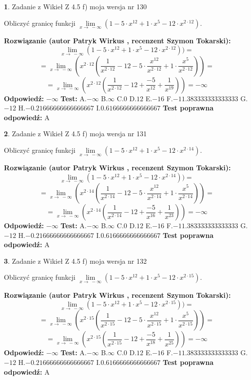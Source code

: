 \documentclass[12pt, a4paper]{article}
\theoremstyle{definition} %
\newtheorem{zad}{}
\newcommand{\zadStart}[1]{\begin{zad}#1\newline}
\newcommand{\zadStop}{\end{zad}}
\newcommand{\rozwStart}[2]{\noindent \textbf{Rozwiązanie (autor #1 , recenzent #2): }\newline}
\newcommand{\rozwStop}{\newline}
\newcommand{\odpStart}{\noindent \textbf{Odpowiedź:}\newline}
\newcommand{\odpStop}{\newline}
\newcommand{\testStart}{\noindent \textbf{Test:}\newline}
\newcommand{\testStop}{\newline}
\newcommand{\kluczStart}{\noindent \textbf{Test poprawna odpowiedź:}\newline}
\newcommand{\kluczStop}{\newline}
\begin{document}
\zadStart{Zadanie z Wikieł Z 4.5 f) moja wersja nr 130}


Obliczyć granicę funkcji  $\lim\limits_{x\to\ -\infty}(1 - 5 \cdot x^{12}+1 \cdot x^{5}- 12 \cdot x^{2\cdot12})$.
\zadStop
\rozwStart{Patryk Wirkus}{Szymon Tokarski}
$$\lim\limits_{x\to\ -\infty}(1 - 5 \cdot x^{12}+1 \cdot x^{5}- 12 \cdot x^{2\cdot12}))=$$
$$=\lim\limits_{x\to\ -\infty}(x^{2\cdot12}(\frac{1}{x^{2\cdot12}}-12 -5 \cdot \frac{x^{12}}{x^{2\cdot12}}+1 \cdot \frac{x^{5}}{x^{2\cdot12}}))=$$
$$=\lim\limits_{x\to\ -\infty}(x^{2\cdot12}(\frac{1}{x^{2\cdot12}}-12 + \frac{-5}{x^{12}}+ \frac{1}{x^{19}}))=-\infty$$
\rozwStop
\odpStart
$-\infty$
\odpStop
\testStart
A.$-\infty$ B.$\infty$ C.$0$ D.$12$ E.$-16$
F.$-11.383333333333333$ G.$-12$
H.$-0.21666666666666667$
I.$0.6166666666666667$
\testStop
\kluczStart
A
\kluczStop



\zadStart{Zadanie z Wikieł Z 4.5 f) moja wersja nr 131}


Obliczyć granicę funkcji  $\lim\limits_{x\to\ -\infty}(1 - 5 \cdot x^{12}+1 \cdot x^{5}- 12 \cdot x^{2\cdot14})$.
\zadStop
\rozwStart{Patryk Wirkus}{Szymon Tokarski}
$$\lim\limits_{x\to\ -\infty}(1 - 5 \cdot x^{12}+1 \cdot x^{5}- 12 \cdot x^{2\cdot14}))=$$
$$=\lim\limits_{x\to\ -\infty}(x^{2\cdot14}(\frac{1}{x^{2\cdot14}}-12 -5 \cdot \frac{x^{12}}{x^{2\cdot14}}+1 \cdot \frac{x^{5}}{x^{2\cdot14}}))=$$
$$=\lim\limits_{x\to\ -\infty}(x^{2\cdot14}(\frac{1}{x^{2\cdot14}}-12 + \frac{-5}{x^{16}}+ \frac{1}{x^{23}}))=-\infty$$
\rozwStop
\odpStart
$-\infty$
\odpStop
\testStart
A.$-\infty$ B.$\infty$ C.$0$ D.$12$ E.$-16$
F.$-11.383333333333333$ G.$-12$
H.$-0.21666666666666667$
I.$0.6166666666666667$
\testStop
\kluczStart
A
\kluczStop



\zadStart{Zadanie z Wikieł Z 4.5 f) moja wersja nr 132}


Obliczyć granicę funkcji  $\lim\limits_{x\to\ -\infty}(1 - 5 \cdot x^{12}+1 \cdot x^{5}- 12 \cdot x^{2\cdot15})$.
\zadStop
\rozwStart{Patryk Wirkus}{Szymon Tokarski}
$$\lim\limits_{x\to\ -\infty}(1 - 5 \cdot x^{12}+1 \cdot x^{5}- 12 \cdot x^{2\cdot15}))=$$
$$=\lim\limits_{x\to\ -\infty}(x^{2\cdot15}(\frac{1}{x^{2\cdot15}}-12 -5 \cdot \frac{x^{12}}{x^{2\cdot15}}+1 \cdot \frac{x^{5}}{x^{2\cdot15}}))=$$
$$=\lim\limits_{x\to\ -\infty}(x^{2\cdot15}(\frac{1}{x^{2\cdot15}}-12 + \frac{-5}{x^{18}}+ \frac{1}{x^{25}}))=-\infty$$
\rozwStop
\odpStart
$-\infty$
\odpStop
\testStart
A.$-\infty$ B.$\infty$ C.$0$ D.$12$ E.$-16$
F.$-11.383333333333333$ G.$-12$
H.$-0.21666666666666667$
I.$0.6166666666666667$
\testStop
\kluczStart
A
\kluczStop
\end{document}
